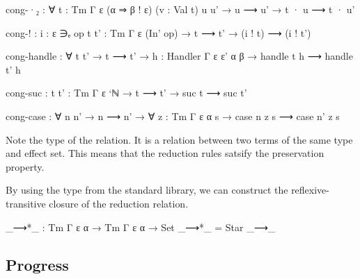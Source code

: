\documentclass[a4paper,11pt]{article}
\newcommand\data[1]{{\AgdaFunction{#1}}}
\begin{document}
\begin{AgdaAlign}
\begin{code}
    cong-·₂ : ∀ {t : Tm Γ ε (α ⇒ β ! ε)} (v : Val t) {u u'}
      → u ⟶ u'
      → t · u ⟶ t · u'

    cong-! : {i : ε ∋ₑ op} {t t' : Tm Γ ε (In' op)}
      → t ⟶ t'
      → (i ! t) ⟶ (i ! t')

    cong-handle : ∀ {t t'}
      → t ⟶ t'
      → {h : Handler Γ ε ε' α β} → handle t h ⟶ handle t' h

    cong-suc : {t t' : Tm Γ ε `ℕ}
      → t ⟶ t'
      → suc t ⟶ suc t'

    cong-case : ∀ {n n'}
      → n ⟶ n'
      → ∀ {z : Tm Γ ε α} {s} → case n z s ⟶ case n' z s
\end{code}
\end{AgdaAlign}
Note the type of the \data{\_⟶\_} relation. It is a relation between two terms of the same type and effect set.
This means that the reduction rules satsify the preservation property.

By using the \data{Star} type from the standard library, we can construct the reflexive-transitive closure of the reduction relation.
\begin{code}
  _⟶*_ : Tm Γ ε α → Tm Γ ε α → Set
  _⟶*_ = Star _⟶_
\end{code}

\subsection{Progress}
\end{document}
